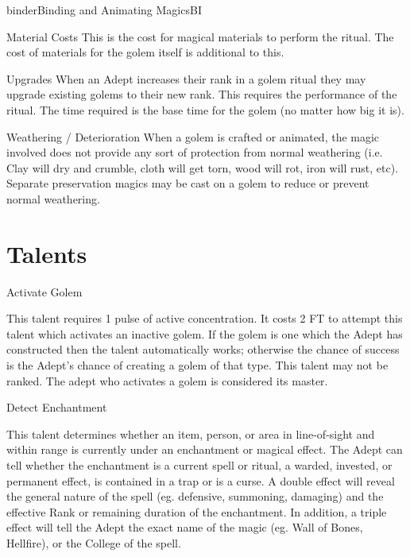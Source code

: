 \begin{College}[1.2]{binder}{Binding and Animating Magics}{BI}
\begin{Description}
\item[Material Costs] This is the cost for magical materials to
  perform the ritual.  The cost of materials for the golem itself is
  additional to this.

\item[Upgrades] When an Adept increases their rank in a golem ritual
  they may upgrade existing golems to their new rank.  This requires
  the performance of the ritual. The time required is the base time
  for the golem (no matter how big it is).

\item[Weathering / Deterioration] When a golem is crafted or animated,
  the magic involved does not provide any sort of protection from
  normal weathering (i.e. Clay will dry and crumble, cloth will get
  torn, wood will rot, iron will rust, etc).  Separate preservation
  magics may be cast on a golem to reduce or prevent normal
  weathering.

\end{Description}


\section{Talents}

\begin{talent}[T-1]{Activate Golem}

\begin{effects}
This talent requires 1 pulse of active concentration. It costs 2 FT to
attempt this talent which activates an inactive golem.  If the golem
is one which the Adept has constructed then the talent automatically
works; otherwise the chance of success is the Adept’s chance of
creating a golem of that type. This talent may not be ranked. The
adept who activates a golem is considered its master.
\end{effects}
\end{talent}

\begin{talent}[T-2]{Detect Enchantment}

\begin{effects}
This talent determines whether an item, person, or area in
line-of-sight and within range is currently under an enchantment or
magical effect.  The Adept can tell whether the enchantment is a
current spell or ritual, a warded, invested, or permanent effect, is
contained in a trap or is a curse. A double effect will reveal the
general nature of the spell (eg.  defensive, summoning, damaging) and
the effective Rank or remaining duration of the enchantment. In
addition, a triple effect will tell the Adept the exact name of the
magic (eg.  Wall of Bones, Hellfire), or the College of the spell.


\end{effects}
\end{talent}
\end{College}

